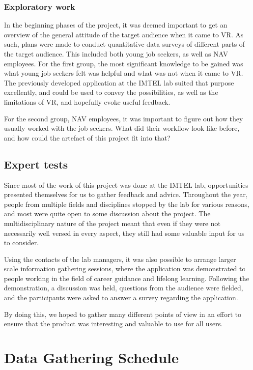 \subsubsection{Exploratory work}
In the beginning phases of the project, it was deemed important to get an overview of the general attitude of the target audience when it came to VR. As such, plans were made to conduct quantitative data surveys of different parts of the target audience. This included both young job seekers, as well as NAV employees. For the first group, the most significant knowledge to be gained was what young job seekers felt was helpful and what was not when it came to VR. The previously developed application at the IMTEL lab suited that purpose excellently, and could be used to convey the possibilities, as well as the limitations of VR, and hopefully evoke useful feedback.

For the second group, NAV employees, it was important to figure out how they usually worked with the job seekers. What did their workflow look like before, and how could the artefact of this project fit into that?


\subsection{Expert tests}
Since most of the work of this project was done at the IMTEL lab, opportunities presented themselves for us to gather feedback and advice. Throughout the year, people from multiple fields and disciplines stopped by the lab for various reasons, and most were quite open to some discussion about the project. The multidisciplinary nature of the project meant that even if they were not necessarily well versed in every aspect, they still had some valuable input for us to consider.

Using the contacts of the lab managers, it was also possible to arrange larger scale information gathering sessions, where the application was demonstrated to people working in the field of career guidance and lifelong learning. Following the demonstration, a discussion was held, questions from the audience were fielded, and the participants were asked to answer a survey regarding the application. 

By doing this, we hoped to gather many different points of view in an effort to ensure that the product was interesting and valuable to use for all users.

\section{Data Gathering Schedule}



\cleardoublepage